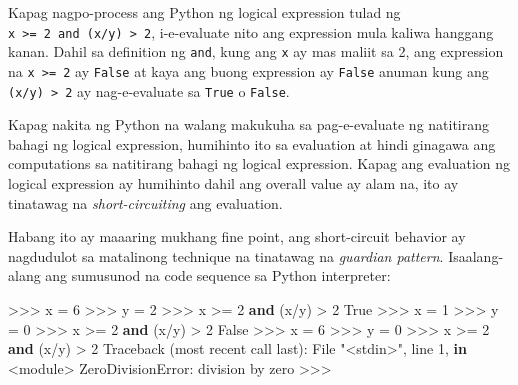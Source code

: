 \documentclass[10pt,]{book}
\newenvironment{Shaded}{}{}
\newcommand{\DecValTok}[1]{\textcolor[rgb]{0.25,0.63,0.44}{#1}}
\newcommand{\KeywordTok}[1]{\textcolor[rgb]{0.00,0.44,0.13}{\textbf{#1}}}
\newcommand{\NormalTok}[1]{#1}
\newcommand{\OperatorTok}[1]{\textcolor[rgb]{0.40,0.40,0.40}{#1}}
\newcommand{\PreprocessorTok}[1]{\textcolor[rgb]{0.74,0.48,0.00}{#1}}
\newcommand{\StringTok}[1]{\textcolor[rgb]{0.25,0.44,0.63}{#1}}
\newcommand{\VariableTok}[1]{\textcolor[rgb]{0.10,0.09,0.49}{#1}}
\begin{document}

Kapag nagpo-process ang Python ng logical expression tulad ng
\texttt{x\ \textgreater{}=\ 2\ and\ (x/y)\ \textgreater{}\ 2},
i-e-evaluate nito ang expression mula kaliwa hanggang kanan. Dahil sa
definition ng \texttt{and}, kung ang \texttt{x} ay mas maliit sa 2, ang
expression na \texttt{x\ \textgreater{}=\ 2} ay \texttt{False} at kaya
ang buong expression ay \texttt{False} anuman kung ang
\texttt{(x/y)\ \textgreater{}\ 2} ay nag-e-evaluate sa \texttt{True} o
\texttt{False}.

Kapag nakita ng Python na walang makukuha sa pag-e-evaluate ng
natitirang bahagi ng logical expression, humihinto ito sa evaluation at
hindi ginagawa ang computations sa natitirang bahagi ng logical
expression. Kapag ang evaluation ng logical expression ay humihinto
dahil ang overall value ay alam na, ito ay tinatawag na
\emph{short-circuiting} ang evaluation.

 

Habang ito ay maaaring mukhang fine point, ang short-circuit behavior ay
nagdudulot sa matalinong technique na tinatawag na \emph{guardian
pattern}. Isaalang-alang ang sumusunod na code sequence sa Python
interpreter:

\begin{Shaded}
\begin{Highlighting}[]
\OperatorTok{\textgreater{}\textgreater{}\textgreater{}}\NormalTok{ x }\OperatorTok{=} \DecValTok{6}
\OperatorTok{\textgreater{}\textgreater{}\textgreater{}}\NormalTok{ y }\OperatorTok{=} \DecValTok{2}
\OperatorTok{\textgreater{}\textgreater{}\textgreater{}}\NormalTok{ x }\OperatorTok{\textgreater{}=} \DecValTok{2} \KeywordTok{and}\NormalTok{ (x}\OperatorTok{/}\NormalTok{y) }\OperatorTok{\textgreater{}} \DecValTok{2}
\VariableTok{True}
\OperatorTok{\textgreater{}\textgreater{}\textgreater{}}\NormalTok{ x }\OperatorTok{=} \DecValTok{1}
\OperatorTok{\textgreater{}\textgreater{}\textgreater{}}\NormalTok{ y }\OperatorTok{=} \DecValTok{0}
\OperatorTok{\textgreater{}\textgreater{}\textgreater{}}\NormalTok{ x }\OperatorTok{\textgreater{}=} \DecValTok{2} \KeywordTok{and}\NormalTok{ (x}\OperatorTok{/}\NormalTok{y) }\OperatorTok{\textgreater{}} \DecValTok{2}
\VariableTok{False}
\OperatorTok{\textgreater{}\textgreater{}\textgreater{}}\NormalTok{ x }\OperatorTok{=} \DecValTok{6}
\OperatorTok{\textgreater{}\textgreater{}\textgreater{}}\NormalTok{ y }\OperatorTok{=} \DecValTok{0}
\OperatorTok{\textgreater{}\textgreater{}\textgreater{}}\NormalTok{ x }\OperatorTok{\textgreater{}=} \DecValTok{2} \KeywordTok{and}\NormalTok{ (x}\OperatorTok{/}\NormalTok{y) }\OperatorTok{\textgreater{}} \DecValTok{2}
\NormalTok{Traceback (most recent call last):}
\NormalTok{  File }\StringTok{"\textless{}stdin\textgreater{}"}\NormalTok{, line }\DecValTok{1}\NormalTok{, }\KeywordTok{in} \OperatorTok{\textless{}}\NormalTok{module}\OperatorTok{\textgreater{}}
\PreprocessorTok{ZeroDivisionError}\NormalTok{: division by zero}
\OperatorTok{\textgreater{}\textgreater{}\textgreater{}}
\end{Highlighting}
\end{Shaded}
\end{document}
